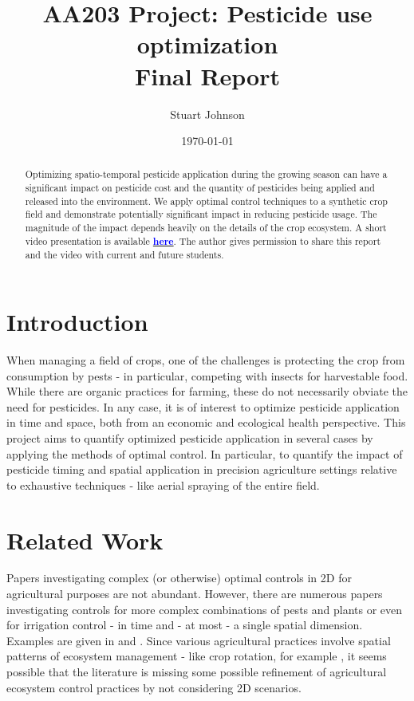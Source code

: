 \documentclass[11pt]{article}
\title{AA203 Project: Pesticide use optimization \\ Final Report}
\author{Stuart Johnson}
\affil{stujohn@stanford.edu}
\date{\today}
\begin{document}
\maketitle

\begin{abstract}
Optimizing spatio-temporal pesticide application during the growing season can have a significant impact on pesticide cost and the quantity of pesticides being applied and released into the environment. We apply optimal control techniques to a synthetic crop field and demonstrate potentially significant impact in reducing pesticide usage. The magnitude of the impact depends heavily on the details of the crop ecosystem. A short video presentation is available \href{https://drive.google.com/file/d/169O7qtcsmYKU-ssS4ibB8lhbKWqD5rC8/view?usp=sharing}{\textcolor{blue}{\textbf{here}}}. The author gives permission to share this report and the video with current and future students.
\end{abstract}

\section{Introduction}
When managing a field of crops, one of the challenges is protecting the crop from consumption by pests - in particular, competing with insects for harvestable food. While there are organic practices for farming, these do not necessarily obviate the need for pesticides. In any case, it is of interest to optimize pesticide application in time and space, both from an economic and ecological health perspective. This project aims to quantify optimized pesticide application in several cases by applying the methods of optimal control. In particular, to quantify the impact of pesticide timing and spatial application in precision agriculture settings relative to exhaustive techniques - like aerial spraying of the entire field.

\section{Related Work}
Papers investigating complex (or otherwise) optimal controls in 2D for agricultural purposes are not abundant. However, there are numerous papers investigating controls for more complex combinations of pests and plants or even for irrigation control - in time and - at most - a single spatial dimension. Examples are given in \cite{R1} and \cite{R2}. Since various agricultural practices involve spatial patterns of ecosystem management - like crop rotation, for example \cite{R3}, it seems possible that the literature is missing some possible refinement of agricultural ecosystem control practices by not considering 2D scenarios.
\end{document}
